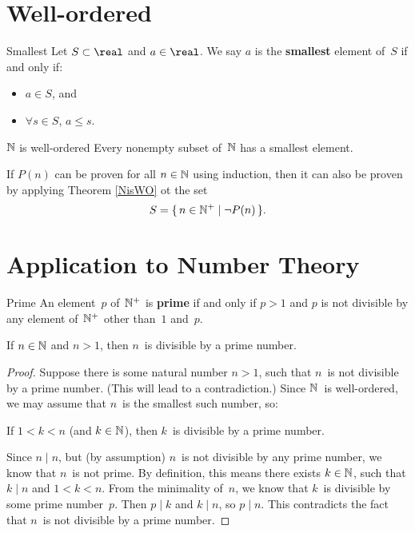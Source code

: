 \documentclass[../MATH-2000-Notes.tex]{subfiles}
\begin{document}
\section{Well-ordered}
\begin{Definition}
    {Smallest}
    Let $S \subset \real$ and $a \in \real$. We say $a$ is the \textbf{smallest} element of~$S$ if and only if:
	\begin{itemize}
	\item $a \in S$,
	and
	\item $\forall s \in S$, $a \le s$.
	\end{itemize}
\end{Definition}

\begin{Theorem}
    {\(\mathbb{N}\) is well-ordered}\label{NisWO}
    Every nonempty subset of~$\mathbb{N}$ has a smallest element.
\end{Theorem}
\begin{Note}
    If \(P(n)\) can be proven for all \(n\in\mathbb{N} \) using induction, then it can also be proven by applying Theorem \ref{NisWO} ot the set \[ S = \{\, n \in \mathbb{N}^+ \mid \neg P(n) \,\} .\]
\end{Note}

\section{Application to Number Theory}
\begin{Definition}
    {Prime}
    An element~$p$ of~$\mathbb{N}^+$ is \textbf{prime} if and only if $p > 1$ and $p$ is not divisible by any element of~$\mathbb{N}^+$ other than~$1$ and~$p$.
\end{Definition}

\begin{Proposition}{} \label{HasPrimeFactor}
    If $n \in \mathbb{N}$ and $n > 1$, then $n$~is divisible by a prime number.
\end{Proposition}
\begin{proof}
    Suppose there is some natural number $n > 1$, such that $n$~is not divisible by a prime number. (This will lead to a contradiction.) Since $\mathbb{N}$~is well-ordered, we may assume that $n$~is the smallest such number, so:
    
    If $1 < k < n$ (and $k \in \mathbb{N}$), then $k$~is divisible by a prime number.
    
    Since $n \mid n$, but (by assumption) $n$~is not divisible by any prime number, we know that $n$~is not prime. By definition, this means there exists $k \in \mathbb{N}$, such that $k \mid n$ and $1 < k < n$. From the minimality of~$n$, we know that $k$~is divisible by some prime number~$p$. Then $p \mid k$ and $k \mid n$, so $p \mid n$. This contradicts the fact that $n$~is not divisible by a prime number.
\end{proof}
\end{document}
